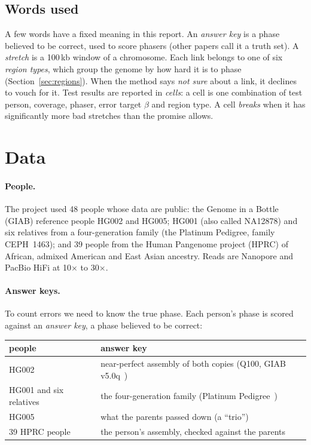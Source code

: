 \documentclass[11pt]{article}
\begin{document}
\subsection{Words used}

A few words have a fixed meaning in this report. An \emph{answer key} is a
phase believed to be correct, used to score phasers (other papers call it a
truth set). A \emph{stretch} is a 100\,kb window of a chromosome. Each link
belongs to one of six \emph{region types}, which group the genome by how hard
it is to phase (Section~\ref{sec:regions}). When the method says \emph{not
sure} about a link, it declines to vouch for it. Test results are reported
in \emph{cells}: a cell is one combination of test person, coverage, phaser,
error target $\beta$ and region type. A cell \emph{breaks} when it has
significantly more bad stretches than the promise allows.

\section{Data}\label{sec:data}

\paragraph{People.} The project used 48 people whose data are public: the
Genome in a Bottle (GIAB) reference people
HG002 and HG005; HG001 (also called NA12878) and six relatives from a
four-generation family (the Platinum Pedigree, family CEPH~1463); and 39
people from the Human Pangenome project (HPRC) of African, admixed American
and East Asian ancestry. Reads are Nanopore and PacBio HiFi at 10$\times$ to
30$\times$.


\paragraph{Answer keys.} To count errors we need to know the true phase. Each
person's phase is scored against an \emph{answer key}, a phase believed to
be correct:

\begin{center}
\small
\begin{tabular}{@{}p{4.2cm}p{11cm}@{}}
\toprule
people & answer key\\
\midrule
HG002 & near-perfect assembly of both copies (Q100, GIAB v5.0q~\cite{hansen2026})\\
HG001 and six relatives & the four-generation family (Platinum Pedigree~\cite{kronenberg2025})\\
HG005 & what the parents passed down (a \enquote{trio})\\
39 HPRC people & the person's assembly, checked against the parents\\
\bottomrule
\end{tabular}
\end{center}
\end{document}
